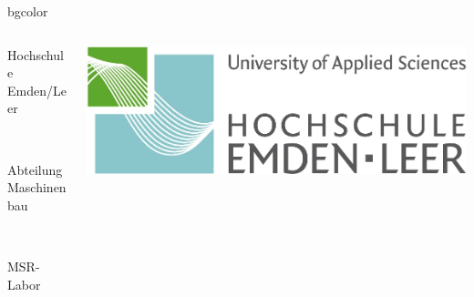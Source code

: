 {%
\begin{beamercolorbox}[rounded=true, center]{bgcolor}
\begin{columns}[T]
\begin{column}{9cm}
{\color{gray}\begin{tiny}Hochschule Emden/Leer\end{tiny}} \\ 
{\color{gray}\begin{tiny}Abteilung Maschinenbau\end{tiny}} \\ 
{\color{gray}\begin{tiny}MSR-Labor\end{tiny}} \\
\end{column}
\begin{column}{2cm}
\includegraphics[scale=0.25]{img/technik.jpg}
\end{column}
\end{columns}
\end{beamercolorbox}
 }
\insertsectionhead
\insertsubsectionhead
{}
\usebackgroundtemplate
{%
      \rule{0pt}{\paperheight}%
      \hspace*{\paperwidth}%
 }

